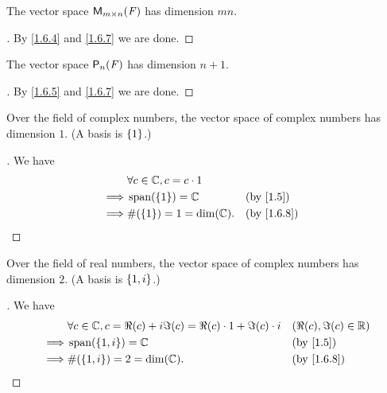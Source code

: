 \begin{eg}\label{1.6.11}
  The vector space \(\mathsf{M}_{{m} \times n}({\mathit{F}})\) has dimension \(mn\).
\end{eg}

\begin{proof}[]
  By \cref{1.6.4} and \cref{1.6.7} we are done.
\end{proof}

\begin{eg}\label{1.6.12}
  The vector space \(\ps[n]{\F}\) has dimension \(n + 1\).
\end{eg}

\begin{proof}[]
  By \cref{1.6.5} and \cref{1.6.7} we are done.
\end{proof}

\begin{eg}\label{1.6.13}
  Over the field of complex numbers, the vector space of complex numbers has dimension \(1\).
  (A basis is \(\left\lbrace1\right\rbrace\).)
\end{eg}

\begin{proof}[]
  We have
  \begin{align*}
             & \forall c \in \C, c = c \cdot 1                               \\
    \implies & \spn{\set{1}} = \C              &  & \text{(by \cref{1.5})}   \\
    \implies & \#\pa{\set{1}} = 1 = \dim(\C).  &  & \text{(by \cref{1.6.8})}
  \end{align*}
\end{proof}

\begin{eg}\label{1.6.14}
  Over the field of real numbers, the vector space of complex numbers has dimension \(2\).
  (A basis is \(\left\lbrace1, i\right\rbrace\).)
\end{eg}

\begin{proof}[]
  We have
  \begin{align*}
             & \forall c \in \C, c = \Re(c) + i \Im(c) = \Re(c) \cdot 1 + \Im(c) \cdot i &  & (\Re(c), \Im(c) \in \R)  \\
    \implies & \spn{\set{1, i}} = \C                                                     &  & \text{(by \cref{1.5})}   \\
    \implies & \#\pa{\set{1, i}} = 2 = \dim(\C).                                         &  & \text{(by \cref{1.6.8})}
  \end{align*}
\end{proof}

